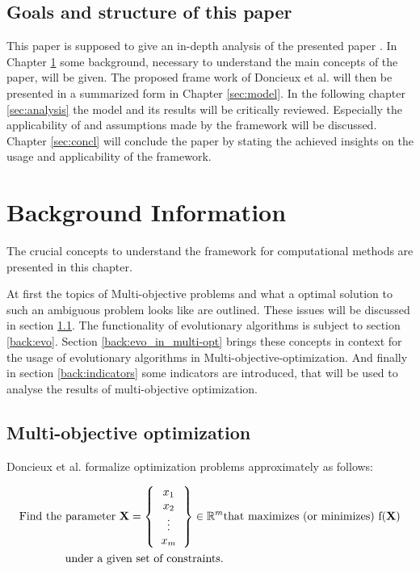 \documentclass[12pt,twoside]{article}
\theoremstyle{plain}
\theoremstyle{definition}
\theoremstyle{remark}
\begin{document}
\subsection{Goals and structure of this paper}
This paper is supposed to give an in-depth analysis of the presented paper \cite{doncieux2015multi}.
In Chapter \ref{sec:background} some background, necessary to understand the main concepts of the paper, will be given.
The proposed frame work of Doncieux et al. will then be presented in a summarized form in Chapter \ref{sec:model}.
In the following chapter \ref{sec:analysis} the model and its results will be critically reviewed.
Especially the applicability of and assumptions made by the framework will be discussed.
Chapter \ref{sec:concl} will conclude the paper by stating the achieved insights on the usage and applicability of the framework. 
\section{Background Information}
\label{sec:background}
The crucial concepts to understand the framework for computational methods are presented in this chapter.

At first the topics of Multi-objective problems and what a optimal solution to such an ambiguous problem looks like are outlined. These issues will be discussed in section \ref{back:multi-opt}. 
The functionality of evolutionary algorithms is subject to section \ref{back:evo}.
Section \ref{back:evo_in_multi-opt} brings these concepts in context for the usage of evolutionary algorithms in Multi-objective-optimization.
And finally in section \ref{back:indicators} some indicators are introduced, that will be used to analyse the results of multi-objective optimization.

\subsection{Multi-objective optimization}
\label{back:multi-opt}
Doncieux et al. \cite{doncieux2015multi} formalize optimization problems approximately as follows:

\begin{align*}
	\text{Find the parameter }\textbf{X} =
	\left \{
	\begin{tabular}{c}
		$x_1$\\
		$x_2$\\
		\vdots\\
		$x_m$
	\end{tabular}
	\right \}
	\in \mathbb{R}^m &\text{that maximizes (or minimizes) f(\textbf{X})}\\
		 \text{under a given set of constraints.}
\end{align*}
\end{document}
